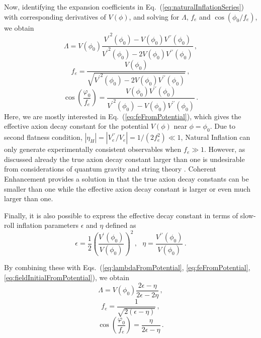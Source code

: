 \documentclass[12pt]{article}
\begin{document}
Now, identifying the expansion coefficients in Eq.~(\ref{eq:naturalInflationSeries}) with corresponding derivatives of $V\left(\phi\right)$, and solving for $\Lambda$, $f_e$ and $\cos\left(\phi_0 / f_e\right)$, we obtain
\begin{equation} \label{eq:lambdaFromPotential}
  \Lambda = V\left(\phi_0\right) \frac
    {{V^\prime}^2\left(\phi_0\right) - V\left(\phi_0\right) V^{\prime\prime}\left(\phi_0\right)}
    {{V^\prime}^2\left(\phi_0\right) - 2 V\left(\phi_0\right) V^{\prime\prime}\left(\phi_0\right)}\,,
\end{equation}
\begin{equation} \label{eq:feFromPotential}
  f_e = \frac
    {V\left(\phi_0\right)}
    {\sqrt{{V^\prime}^2\left(\phi_0\right) - 2 V\left(\phi_0\right) V^{\prime\prime}\left(\phi_0\right)}}\,,
\end{equation}
\begin{equation} \label{eq:fieldInitialFromPotential}
  \cos\left(\frac{\varphi_0}{f_e}\right) = \frac
    {V\left(\phi_0\right) V^{\prime\prime}\left(\phi_0\right)}
    {{V^\prime}^2\left(\phi_0\right) - V\left(\phi_0\right) V^{\prime\prime}\left(\phi_0\right)}\,.
\end{equation}
Here, we are mostly interested in Eq.~(\ref{eq:feFromPotential}), which gives the effective axion decay constant for the potential $V\left(\phi\right)$ near $\phi = \phi_0$.
Due to second flatness condition, $\left|\eta_H\right| = \left|V_e^{\prime\prime} / V_e\right| = 1 / \left(2 f_e^2\right) \ll 1$, Natural Inflation can only generate experimentally consistent observables when $f_e \gg 1$.
However, as discussed already the true axion decay constant larger than one is undesirable from considerations of quantum gravity and string theory \cite{Kallosh:1995hi, Banks:2003sx}.
Coherent Enhancement provides a solution in that the true axion decay constants can be smaller than one while the effective axion decay constant is larger or even much larger than one.

Finally, it is also possible to express the effective decay constant in terms of slow-roll inflation parameters $\epsilon$ and $\eta$ defined as
\begin{equation} \label{eq:epsEtaFromPotential}
  \epsilon = \frac{1}{2} \left(\frac{V^\prime\left(\phi_0\right)}{V\left(\phi_0\right)}\right)^2\,,
  ~~~ \eta = \frac{V^{\prime\prime}\left(\phi_0\right)}{V\left(\phi_0\right)}\,.
\end{equation}

By combining these with Eqs.~(\ref{eq:lambdaFromPotential}, \ref{eq:feFromPotential}, \ref{eq:fieldInitialFromPotential}), we obtain
\begin{equation} \label{eq:lambdaSlowRoll}
  \Lambda = V\left(\phi_0\right) \frac{2 \epsilon - \eta}{2 \epsilon - 2 \eta}\,,
\end{equation}
\begin{equation} \label{eq:feSlowRoll}
  f_e = \frac{1}{\sqrt{2 \left(\epsilon - \eta\right)}}\,,
\end{equation}
\begin{equation} \label{eq:FieldInitialSlowRoll}
  \cos\left(\frac{\varphi_0}{f_e}\right) = \frac{\eta}{2 \epsilon - \eta}\,.
\end{equation}
\end{document}
